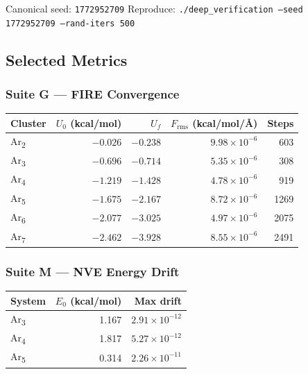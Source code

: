 \documentclass[11pt]{article}
\begin{document}
\noindent Canonical seed: \texttt{1772952709}\quad
Reproduce: \texttt{./deep\_verification --seed 1772952709 --rand-iters 500}

\subsection{Selected Metrics}

\subsubsection*{Suite G --- FIRE Convergence}

\begin{center}
\begin{tabular}{lrrrr}
\toprule
Cluster & $U_0$ (kcal/mol) & $U_f$ & $F_\mathrm{rms}$ (kcal/mol/\AA) & Steps \\
\midrule
Ar\textsubscript{2} & $-0.026$ & $-0.238$ & $9.98\times10^{-6}$ & 603 \\
Ar\textsubscript{3} & $-0.696$ & $-0.714$ & $5.35\times10^{-6}$ & 308 \\
Ar\textsubscript{4} & $-1.219$ & $-1.428$ & $4.78\times10^{-6}$ & 919 \\
Ar\textsubscript{5} & $-1.675$ & $-2.167$ & $8.72\times10^{-6}$ & 1269 \\
Ar\textsubscript{6} & $-2.077$ & $-3.025$ & $4.97\times10^{-6}$ & 2075 \\
Ar\textsubscript{7} & $-2.462$ & $-3.928$ & $8.55\times10^{-6}$ & 2491 \\
\bottomrule
\end{tabular}
\end{center}

\subsubsection*{Suite M --- NVE Energy Drift}

\begin{center}
\begin{tabular}{lrr}
\toprule
System & $E_0$ (kcal/mol) & Max drift \\
\midrule
Ar\textsubscript{3} & 1.167 & $2.91\times10^{-12}$ \\
Ar\textsubscript{4} & 1.817 & $5.27\times10^{-12}$ \\
Ar\textsubscript{5} & 0.314 & $2.26\times10^{-11}$ \\
\bottomrule
\end{tabular}
\end{center}
\end{document}
